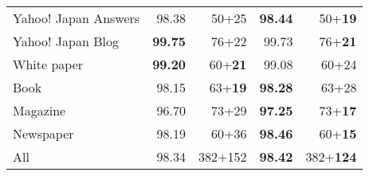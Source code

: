 \documentclass[11pt,letterpaper]{article}
\begin{document}
\begin{table*}[t]
\begin{center}
\begin{tabular}{p{53mm}|r|r|r|r}
        \midrule                                                                                                                                                                                                                                                                                                            
      Yahoo! Japan Answers& 98.38 &50+25& {\bf 98.44} &  50+{\bf19}\\     
      Yahoo! Japan Blog&  {\bf 99.75}& 76+22& 99.73&76+{\bf21}\\                                                                                                                              
      White paper& {\bf 99.20} &60+{\bf21}  &99.08& 60+24\\
      Book&  98.15&63+{\bf19} &  {\bf 98.28}&63+28\\ 
      Magazine & 96.70& 73+29  &{\bf 97.25}&73+{\bf17} \\ 
       Newspaper&  98.19 &60+36&  {\bf 98.46}& 60+{\bf15}\\  \hline                                                  
      All  & 98.34 &382+152& {\bf 98.42} & 382+{\bf124}\\                                                                                                                                                                                                                                                                                                                                       
    \bottomrule                                                                                                                                               
    \end{tabular}                                                                                                                                                                                                                                                                                                           
    \end{center}                                                                                                                                                                                                                                                                                                            
 \end{table*} 
\end{document}

